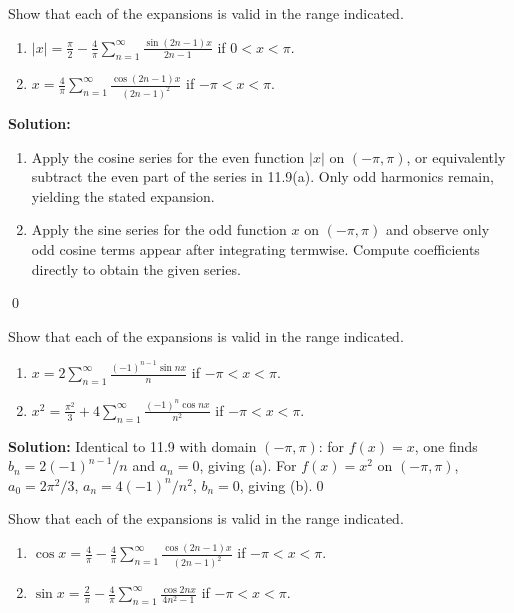 \begin{problembox}
Show that each of the expansions is valid in the range indicated.
\begin{enumerate}[label=(\alph*)]
\item $|x| = \frac{\pi}{2} - \frac{4}{\pi} \sum_{n=1}^\infty \frac{\sin (2n - 1)x}{2n - 1}$ if $0 < x < \pi$.
\item $x = \frac{4}{\pi} \sum_{n=1}^\infty \frac{\cos (2n - 1)x}{(2n - 1)^2}$ if $-\pi < x < \pi$.
\end{enumerate}
\end{problembox}

\noindent\textbf{Solution:}
\begin{enumerate}[label=(\alph*)]
\item Apply the cosine series for the even function $|x|$ on $(-\pi,\pi)$, or equivalently subtract the even part of the series in 11.9(a). Only odd harmonics remain, yielding the stated expansion.
\item Apply the sine series for the odd function $x$ on $(-\pi,\pi)$ and observe only odd cosine terms appear after integrating termwise. Compute coefficients directly to obtain the given series.
\end{enumerate}\qed


\begin{problembox}
Show that each of the expansions is valid in the range indicated.
\begin{enumerate}[label=(\alph*)]
\item $x = 2 \sum_{n=1}^\infty \frac{(-1)^{n-1} \sin nx}{n}$ if $-\pi < x < \pi$.
\item $x^2 = \frac{\pi^2}{3} + 4 \sum_{n=1}^\infty \frac{(-1)^n \cos nx}{n^2}$ if $-\pi < x < \pi$.
\end{enumerate}
\end{problembox}

\noindent\textbf{Solution:}
Identical to 11.9 with domain $(-\pi,\pi)$: for $f(x)=x$, one finds $b_n=2(-1)^{n-1}/n$ and $a_n=0$, giving (a). For $f(x)=x^2$ on $(-\pi,\pi)$, $a_0=2\pi^2/3$, $a_n=4(-1)^n/n^2$, $b_n=0$, giving (b).\qed


\begin{problembox}
Show that each of the expansions is valid in the range indicated.
\begin{enumerate}[label=(\alph*)]
\item $\cos x = \frac{4}{\pi} - \frac{4}{\pi} \sum_{n=1}^\infty \frac{\cos (2n - 1)x}{(2n - 1)^2}$ if $-\pi < x < \pi$.
\item $\sin x = \frac{2}{\pi} - \frac{4}{\pi} \sum_{n=1}^\infty \frac{\cos 2nx}{4n^2 - 1}$ if $-\pi < x < \pi$.
\end{enumerate}
\end{problembox}

